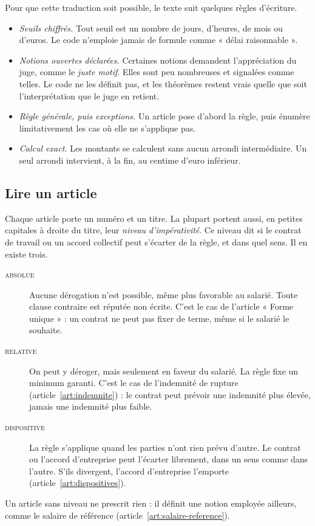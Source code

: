 \documentclass[11pt,a4paper]{article}
\newcounter{article}
\begin{document}
Pour que cette traduction soit possible, le texte suit quelques règles
d'écriture.
\begin{itemize}
  \item \emph{Seuils chiffrés.} Tout seuil est un nombre de jours, d'heures,
    de mois ou d'euros. Le code n'emploie jamais de formule comme
    « délai raisonnable ».
  \item \emph{Notions ouvertes déclarées.} Certaines notions demandent
    l'appréciation du juge, comme le \emph{juste motif}. Elles sont peu
    nombreuses et signalées comme telles. Le code ne les définit pas, et les
    théorèmes restent vrais quelle que soit l'interprétation que le juge en
    retient.
  \item \emph{Règle générale, puis exceptions.} Un article pose d'abord la
    règle, puis énumère limitativement les cas où elle ne s'applique pas.
  \item \emph{Calcul exact.} Les montants se calculent sans aucun arrondi
    intermédiaire. Un seul arrondi intervient, à la fin, au centime d'euro
    inférieur.
\end{itemize}

\subsection*{Lire un article}
Chaque article porte un numéro et un titre. La plupart portent aussi, en
petites capitales à droite du titre, leur \emph{niveau d'impérativité}. Ce
niveau dit si le contrat de travail ou un accord collectif peut s'écarter de
la règle, et dans quel sens. Il en existe trois.
\begin{description}
  \item[\textmd{\textsc{absolue}}] Aucune dérogation n'est possible, même plus
    favorable au salarié. Toute clause contraire est réputée non écrite.
    C'est le cas de l'article « Forme unique » : un contrat ne peut pas
    fixer de terme, même si le salarié le souhaite.
  \item[\textmd{\textsc{relative}}] On peut y déroger, mais seulement en faveur du
    salarié. La règle fixe un minimum garanti. C'est le cas de l'indemnité
    de rupture (article~\ref{art:indemnite}) : le contrat peut prévoir une
    indemnité plus élevée, jamais une indemnité plus faible.
  \item[\textmd{\textsc{dispositive}}] La règle s'applique quand les parties n'ont
    rien prévu d'autre. Le contrat ou l'accord d'entreprise peut l'écarter
    librement, dans un sens comme dans l'autre. S'ils divergent, l'accord
    d'entreprise l'emporte (article~\ref{art:dispositives}).
\end{description}
Un article sans niveau ne prescrit rien : il définit une notion employée
ailleurs, comme le salaire de référence
(article~\ref{art:salaire-reference}).
\end{document}
